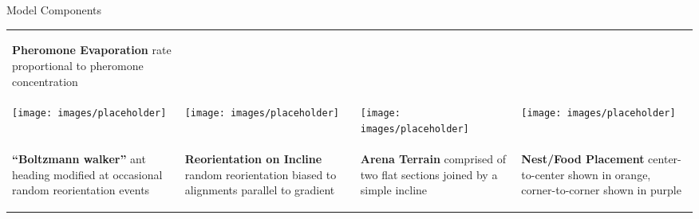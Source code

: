 \begin{block}{Model Components}
\begin{tabular}{*{4}{>{\centering\arraybackslash}p{}}}
\begin{spacing}{1.0}
\raggedright{\small
\textbf{Pheromone Evaporation} rate proportional to pheromone concentration}
\end{spacing} \\[-1.5cm]
\texttt{[image: images/placeholder]} &
\texttt{[image: images/placeholder]} &
\texttt{[image: images/placeholder]} &
\texttt{[image: images/placeholder]} \\
\begin{spacing}{1.0}
\raggedright{\small
\textbf{``Boltzmann walker''} ant heading modified at occasional random reorientation events}
\end{spacing} &
\begin{spacing}{1.0}
\raggedright{\small
\textbf{Reorientation on Incline} random reorientation biased to alignments parallel to gradient}
\end{spacing} &
\begin{spacing}{1.0}
\raggedright{\small
\textbf{Arena Terrain} comprised of two flat sections joined by a simple incline}
\end{spacing} &
\begin{spacing}{1.0}
\raggedright{\small
\textbf{Nest/Food Placement} center-to-center shown in orange, corner-to-corner shown in purple}
\end{spacing} \\
\end{tabular}
\end{block}
